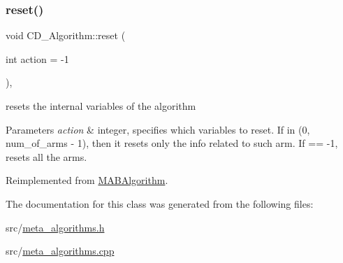 \mbox{\label{class_c_d___algorithm_a493e6eaafb4ab105c94e9e4c33143d39}} 
\subsubsection{\texorpdfstring{reset()}{reset()}}
{\footnotesize\ttfamily void C\+D\+\_\+\+Algorithm\+::reset (\begin{DoxyParamCaption}\item[{int}]{action = {\ttfamily -\/1} }\end{DoxyParamCaption})\hspace{0.3cm}{\ttfamily [override]}, {\ttfamily [virtual]}}



resets the internal variables of the algorithm 


\begin{DoxyParams}{Parameters}
{\em action} & integer, specifies which variables to reset. If in (0, num\+\_\+of\+\_\+arms -\/ 1), then it resets only the info related to such arm. If == -\/1, resets all the arms. \\
\hline
\end{DoxyParams}


Reimplemented from \mbox{\hyperlink{class_m_a_b_algorithm_ad5761cee0b0e3421d1f043dbcc0b5f85}{M\+A\+B\+Algorithm}}.



The documentation for this class was generated from the following files\+:\begin{DoxyCompactItemize}
\item 
src/\mbox{\hyperlink{meta__algorithms_8h}{meta\+\_\+algorithms.\+h}}\item 
src/\mbox{\hyperlink{meta__algorithms_8cpp}{meta\+\_\+algorithms.\+cpp}}\end{DoxyCompactItemize}
